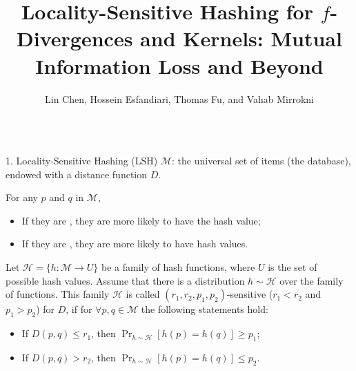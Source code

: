 \documentclass[final]{beamer}
\title{Locality-Sensitive Hashing for $f$-Divergences and \kr Kernels: 
	Mutual 
	Information Loss and Beyond}
\author{Lin Chen\inst{1,2}, 
	Hossein Esfandiari\inst{1},
	Thomas Fu\inst{1}, and
	Vahab Mirrokni\inst{1}
	 \vspace{10pt}}
\institute{{  \inst{1}Google Research, \inst{2}Yale University }\vspace{10pt}}
\DeclareMathOperator{\pr}{Pr}
\newlength{\onecolwid}
\begin{document}
	
	
	
	\begin{frame}[t] %
	\begin{columns}[t] %
	\begin{column}{\onecolwid} %
			\vspace{-40pt}
				
			\begin{block}{1. Locality-Sensitive Hashing (LSH)}	
				$ \mathcal{M} $: the universal set of items (the 
				database), endowed with 
				a distance function $ D $.	
				
				For any $ p $ and $ q $ in $ \mathcal{M} $,
				\begin{itemize}
					\item If they are , they are more likely 
					to 
					have the 
					 hash value;
					\item If they are , 
					they are more likely to have  hash 
					values. 
				\end{itemize}
				 
				
				  Let $ \mathcal{H} = \{ 
				h:\mathcal{M}\to U \} $ be a 
				family of hash functions, where $ U $ is the set of possible 
				hash values. 
				Assume that there is a distribution $ h\sim 
				\mathcal{H} $ over the family of 
				functions. This family $ \mathcal{H} $ is called $ (r_1, r_2, 
				p_1,p_2) 
				$-sensitive  ($ r_1<r_2 $ and $ p_1>p_2 $) for $ D $, if for $ 
				\forall p, q 
				\in \mathcal{M} $ the following statements hold:
				\begin{itemize}
					\item If $ D(p, q) \le r_1 $, then $ \pr_{h\sim 
						\mathcal{H}}[h(p)=h(q)]\ge p_1 $; 
					\item If $ D(p, q) > r_2 $, then $ \pr_{h\sim 
						\mathcal{H}}[h(p)=h(q)]\le p_2 $.
				\end{itemize}
				

		\end{block}
			

\end{column}
\end{columns}
\end{frame}
\end{document}
